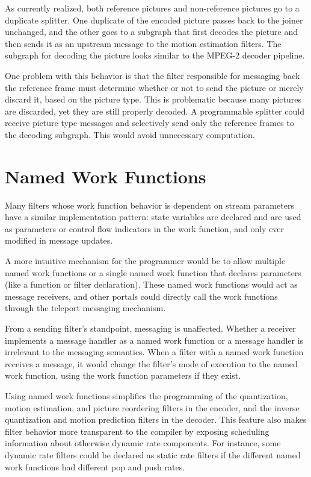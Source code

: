 As currently realized, both reference pictures and non-reference pictures
go to a duplicate splitter. One duplicate of the encoded picture passes back 
to the joiner unchanged, and the other goes to a subgraph that first
decodes the picture and then sends it as an upstream message
to the motion estimation filters. The subgraph for decoding the picture
looks similar to the MPEG-2 decoder pipeline.

One problem with this behavior is that the filter responsible for messaging
back the reference frame must determine whether or not to send the 
picture or merely discard it, based on the picture type. This is
problematic because many pictures are discarded, yet they are still properly
decoded. A programmable splitter 
could receive picture type messages and selectively send only the 
reference frames to the decoding subgraph. This would avoid
unnecessary computation.

\section{Named Work Functions}

Many filters whose work function behavior is dependent on stream parameters 
have a similar implementation pattern: state variables are declared and are 
used as parameters or control flow indicators in the work function, and only 
ever modified in message updates. 

A more intuitive mechanism for the programmer 
would be to allow multiple named work functions or a single named work 
function that declares parameters (like a function or filter 
declaration). These named work functions would act as message receivers, and 
other portals could directly call the work functions through the teleport 
messaging mechanism. 

From a sending filter's standpoint, messaging is unaffected.
Whether a receiver implements a message handler as a 
named work function or a message handler is irrelevant to the messaging semantics. 
When a filter with a named work function receives a message, 
it would change the filter's mode of execution to the named work function,
using the work function parameters if they exist.

Using named work functions simplifies the programming of the quantization, motion 
estimation, and picture reordering filters in the encoder, and the inverse 
quantization and motion prediction filters in the decoder. 
This feature also makes filter behavior more transparent to the compiler
by exposing scheduling information about otherwise dynamic rate components. 
For instance, some dynamic rate filters could be declared as static rate filters
if the different named work functions had different pop and push rates.

